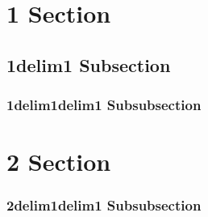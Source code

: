 \section{1 Section}\label{sec:section}

\subsection{1delim1 Subsection}\label{sec:subsection}

\subsubsection{1delim1delim1 Subsubsection}\label{sec:subsubsection}

\section{2 Section}\label{sec:section-1}

\subsubsection{2delim1delim1 Subsubsection}\label{sec:subsubsection-1}
